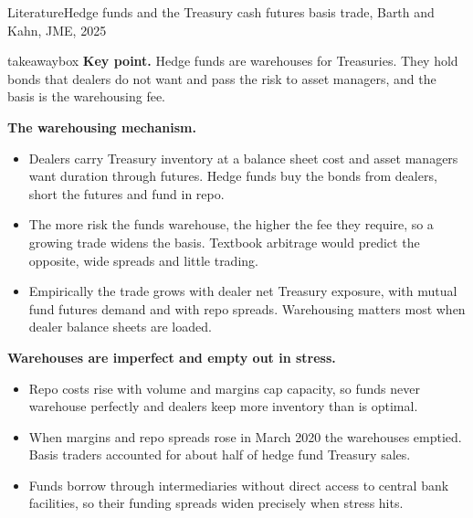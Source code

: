 \documentclass[aspectratio=169,11pt]{beamer}
\newcommand{\keypoint}[1]{%
  \begin{beamercolorbox}[sep=0.6em,wd=\textwidth]{takeawaybox}
    \textbf{Key point.} #1
  \end{beamercolorbox}}
\begin{document}
\begin{frame}{Literature}{Hedge funds and the Treasury cash futures basis trade, Barth and Kahn, JME, 2025}
  \footnotesize
  \keypoint{Hedge funds are warehouses for Treasuries. They hold bonds that dealers do not want and pass the risk to asset managers, and the basis is the warehousing fee.}
  \medskip
  \textbf{The warehousing mechanism.}
  \begin{itemize}
    \item Dealers carry Treasury inventory at a balance sheet cost and asset managers want duration through futures. Hedge funds buy the bonds from dealers, short the futures and fund in repo.
    \item The more risk the funds warehouse, the higher the fee they require, so a growing trade widens the basis. Textbook arbitrage would predict the opposite, wide spreads and little trading.
    \item Empirically the trade grows with dealer net Treasury exposure, with mutual fund futures demand and with repo spreads. Warehousing matters most when dealer balance sheets are loaded.
  \end{itemize}
  \smallskip
  \textbf{Warehouses are imperfect and empty out in stress.}
  \begin{itemize}
    \item Repo costs rise with volume and margins cap capacity, so funds never warehouse perfectly and dealers keep more inventory than is optimal.
    \item When margins and repo spreads rose in March 2020 the warehouses emptied. Basis traders accounted for about half of hedge fund Treasury sales.
    \item Funds borrow through intermediaries without direct access to central bank facilities, so their funding spreads widen precisely when stress hits.
  \end{itemize}
\end{frame}
\end{document}
